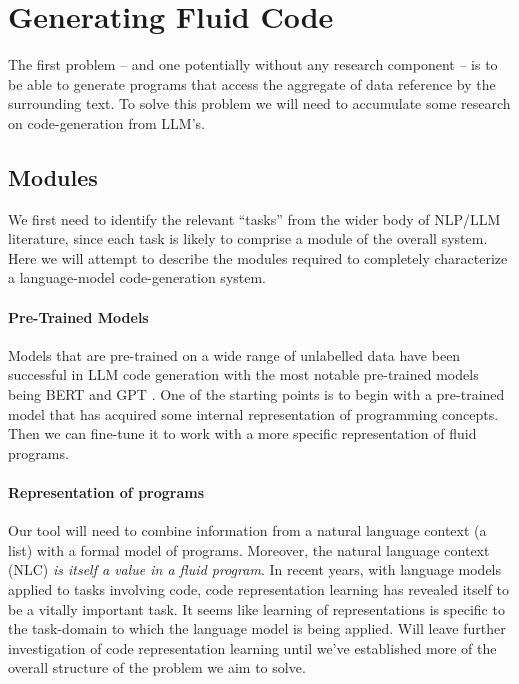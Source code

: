 \section{Generating Fluid Code}
\label{sec:generate-fluid}

The first problem -- and one potentially without any research component -- is to be able
to generate  programs that access the aggregate of data reference by the surrounding text.
To solve this problem we will need to accumulate some research on code-generation from LLM's.

\subsection{Modules}
We first need to identify the relevant ``tasks'' from the wider body of NLP/LLM literature,
since each task is likely to comprise a module of the overall system. Here we will attempt
to describe the modules required to completely characterize a language-model code-generation
system.

\paragraph*{Pre-Trained Models}
Models that are pre-trained on a wide range of unlabelled data have been successful in LLM
code generation with the most notable pre-trained models being BERT \citep{devlin2019}
and GPT \citep{radford2018}. One of the starting points is to begin with a pre-trained model
that has acquired some internal representation of programming concepts. Then we can fine-tune
it to work with a more specific representation of fluid programs.

\paragraph*{Representation of  programs}
Our tool will need to combine information from a natural language context (a  list)
with a formal model of  programs. Moreover, the natural language context (NLC)
\textit{is itself a value in a fluid program}. In recent years, with language models applied to tasks
involving code, code representation learning has revealed itself to be a vitally important task.
It seems like learning of representations is specific to the task-domain to which the language model
is being applied. Will leave further investigation of code representation learning until we've 
established more of the overall structure of the problem we aim to solve.
